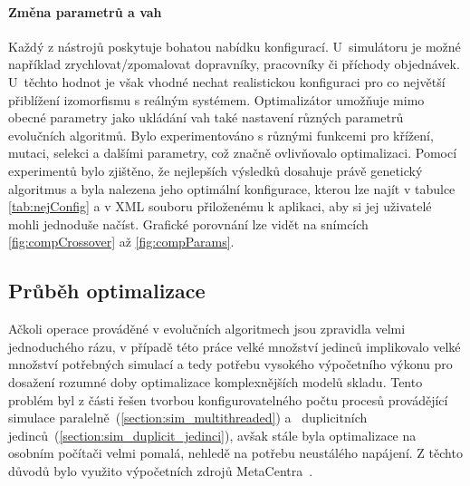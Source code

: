 \paragraph{Změna parametrů a vah}
Každý z nástrojů poskytuje bohatou nabídku konfigurací. U~simulátoru je možné například zrychlovat/zpomalovat dopravníky, pracovníky či příchody objednávek. U~těchto hodnot je však vhodné nechat realistickou konfiguraci pro co největší přiblížení izomorfismu s reálným systémem. Optimalizátor umožňuje mimo obecné parametry jako ukládání vah také nastavení různých parametrů evolučních algoritmů. Bylo experimentováno s různými funkcemi pro křížení, mutaci, selekci a dalšími parametry, což značně ovlivňovalo optimalizaci. Pomocí experimentů bylo zjištěno, že nejlepších výsledků dosahuje právě genetický algoritmus a byla nalezena jeho optimální konfigurace, kterou lze najít v tabulce \ref{tab:nejConfig} a v XML souboru přiloženému k aplikaci, aby si jej uživatelé mohli jednoduše načíst. Grafické porovnání lze vidět na snímcích \ref{fig:compCrossover} až \ref{fig:compParams}.

\subsection{Průběh optimalizace}
Ačkoli operace prováděné v evolučních algoritmech jsou zpravidla velmi jednoduchého rázu, v případě této práce velké množství jedinců implikovalo velké množství potřebných simulací a tedy potřebu vysokého výpočetního výkonu pro dosažení rozumné doby optimalizace komplexnějších modelů skladu. Tento problém byl z části řešen tvorbou konfigurovatelného počtu procesů provádějící simulace paralelně~(\ref{section:sim_multithreaded}) a~ duplicitních jedinců~(\ref{section:sim_duplicit_jedinci}), avšak stále byla optimalizace na osobním počítači velmi pomalá, nehledě na potřebu neustálého napájení. Z těchto důvodů bylo využito výpočetních zdrojů MetaCentra~\cite{metacentrum}.

